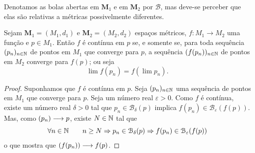 	Denotamos as bolas abertas em $\bm M_1$ e em $\bm M_2$ por $\mathcal B$, mas deve-se perceber que elas são relativas a métricas possivelmente diferentes. 

\begin{prop}
	Sejam $\bm M_1 = (M_1,d_1)$ e $\bm M_2 = (M_2,d_2)$ espaços métricos, $f: M_1 \to M_2$ uma função e $p \in M_1$. Então $f$ é contínua em $p$ se, e somente se, para toda sequência $(p_n)_{n \in \mathbb{N}}$ de pontos em $M_1$ que converge para $p$, a sequência $(f(p_n))_{n \in \mathbb{N}}$ de pontos em $M_2$ converge para $f(p)$; ou seja
	\begin{equation*}
	\lim f(p_n) = f(\lim p_n).
	\end{equation*}
\end{prop}
\begin{proof}
	Suponhamos que $f$ é contínua em $p$. Seja $(p_n)_{n \in \mathbb{N}}$ uma sequência de pontos em $M_1$ que converge para $p$. Seja um número real $\varepsilon > 0$. Como $f$ é contínua, existe um número real $\delta > 0$ tal que $p_n \in \mathcal B_\delta(p)$ implica $f(p_n) \in \mathcal B_\varepsilon(f(p))$. Mas, como $(p_n) \longrightarrow p$, existe $N \in \mathbb{N}$ tal que
	\begin{equation*}
	\forall n \in \mathbb{N} \qquad n \geq N \Rightarrow p_n \in \mathcal B_\delta(p) \Rightarrow f(p_n) \in \mathcal B_\varepsilon(f(p))
	\end{equation*}
o que mostra que $(f(p_n)) \longrightarrow f(p)$.
	

\end{proof}
